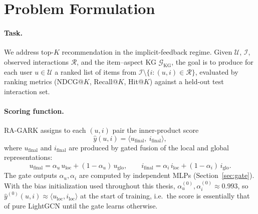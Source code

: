 \section{Problem Formulation}
\label{sec:approach-problem}

\paragraph{Task.} We address top-$K$ recommendation in the implicit-feedback regime. Given $\mathcal{U}$, $\mathcal{I}$, observed interactions $\mathcal{R}$, and the item--aspect KG $\mathcal{G}_{\mathrm{KG}}$, the goal is to produce for each user $u \in \mathcal{U}$ a ranked list of items from $\mathcal{I} \setminus \{i : (u, i) \in \mathcal{R}\}$, evaluated by ranking metrics (NDCG@$K$, Recall@$K$, Hit@$K$) against a held-out test interaction set.

\paragraph{Scoring function.} RA-GARK assigns to each $(u, i)$ pair the inner-product score
\begin{equation}
\label{eq:score}
\hat{y}(u, i) = \langle u_{\mathrm{final}},\ i_{\mathrm{final}} \rangle,
\end{equation}
where $u_{\mathrm{final}}$ and $i_{\mathrm{final}}$ are produced by gated fusion of the local and global representations:
\begin{equation}
\label{eq:fusion}
u_{\mathrm{final}} = \alpha_u\, u_{\mathrm{loc}} + (1 - \alpha_u)\, u_{\mathrm{glo}}, \qquad
i_{\mathrm{final}} = \alpha_i\, i_{\mathrm{loc}} + (1 - \alpha_i)\, i_{\mathrm{glo}}.
\end{equation}
The gate outputs $\alpha_u, \alpha_i$ are computed by independent MLPs (Section~\ref{sec:gate}). With the bias initialization used throughout this thesis, $\alpha_u^{(0)}, \alpha_i^{(0)} \approx 0.993$, so $\hat{y}^{(0)}(u, i) \approx \langle u_{\mathrm{loc}}, i_{\mathrm{loc}} \rangle$ at the start of training, i.e.\ the score is essentially that of pure LightGCN until the gate learns otherwise.

